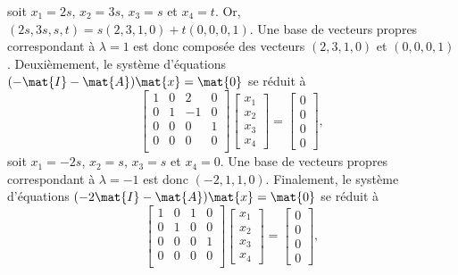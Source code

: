 \begin{exercice}
\begin{sol}
\begin{enumerate}
\begin{displaymath}
      \end{displaymath}
      soit $x_1 = 2s$, $x_2 = 3s$, $x_3 = s$ et $x_4 = t$. Or, $(2s,
      3s, s, t) = s(2, 3, 1, 0) + t (0, 0, 0, 1)$. Une base de
      vecteurs propres correspondant à $\lambda = 1$ est donc composée
      des vecteurs $(2, 3, 1, 0)$ et $(0, 0, 0, 1)$.  Deuxièmement, le
      système d'équations $(-\mat{I} - \mat{A}) \mat{x} = \mat{0}$ se
      réduit à
      \begin{displaymath}
        \begin{bmatrix}
          1 & 0 &  2 & 0 \\
          0 & 1 & -1 & 0 \\
          0 & 0 &  0 & 1 \\
          0 & 0 &  0 & 0 \\
        \end{bmatrix}
        \begin{bmatrix} x_1 \\ x_2 \\ x_3 \\ x_4 \end{bmatrix} =
        \begin{bmatrix} 0 \\ 0 \\ 0 \\ 0 \end{bmatrix},
      \end{displaymath}
      soit $x_1 = -2s$, $x_2 = s$, $x_3 = s$ et $x_4 = 0$. Une base de
      vecteurs propres correspondant à $\lambda = -1$ est donc $(-2,
      1, 1, 0)$.  Finalement, le système d'équations $(-2\mat{I} -
      \mat{A}) \mat{x} = \mat{0}$ se réduit à
      \begin{displaymath}
        \begin{bmatrix}
          1 &  0 &  1 &  0 \\
          0 &  1 &  0 &  0 \\
          0 &  0 &  0 &  1 \\
          0 &  0 &  0 &  0 \\
        \end{bmatrix}
        \begin{bmatrix} x_1 \\ x_2 \\ x_3 \\ x_4 \end{bmatrix} =
        \begin{bmatrix} 0 \\ 0 \\ 0 \\ 0 \end{bmatrix},

\end{displaymath}
\end{enumerate}
\end{sol}
\end{exercice}
